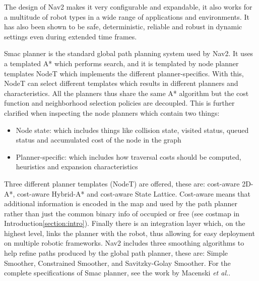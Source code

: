 
The design of Nav2 makes it very configurable and expandable, it also works for a multitude of robot types in a wide range of applications and environments\:\cite{macenski_marathon_2020}. It has also been shown to be safe, deterministic, reliable and robust in dynamic settings even during extended time frames\:\cite{macenski_marathon_2020}. 

Smac planner is the standard global path planning system used by Nav2\:\cite{macenski_open-source_2024}. It uses a templated A* which performs search, and it is templated by node planner templates NodeT which implements the different planner-specifics\:\cite{macenski_open-source_2024}. With this, NodeT can select different templates which results in different planners and characteristics\:\cite{macenski_open-source_2024}. All the planners thus share the same A* algorithm but the cost function and neighborhood selection policies are decoupled\:\cite{macenski_open-source_2024}. This is further clarified when inspecting the node planners which contain two things\:\cite{macenski_open-source_2024}:
\begin{itemize}
    \item Node state: which includes things like collision state, visited status, queued status and accumulated cost of the node in the graph
    \item Planner-specific: which includes how traversal costs should be computed, heuristics and expansion characteristics
\end{itemize}
Three different planner templates (NodeT) are offered, these are: cost-aware 2D-A*, cost-aware Hybrid-A* and cost-aware State Lattice\:\cite{macenski_open-source_2024}. Cost-aware means that additional information is encoded in the map and used by the path planner rather than just the common binary info of occupied or free (see costmap in Introduction\:\ref{section:intro})\:\cite{macenski_open-source_2024}.
Finally there is an integration layer which, on the highest level, links the planner with the robot, thus allowing for easy deployment on multiple robotic frameworks\:\cite{macenski_open-source_2024}.
Nav2 includes three smoothing algorithms to help refine paths produced by the global path planner, these are: Simple Smoother, Constrained Smoother, and Savitzky-Golay Smoother\:\cite{macenski_desks_2023}.
For the complete specifications of Smac planner, see the work by Macenski \textit{et al.}\:\cite{macenski_open-source_2024}.

